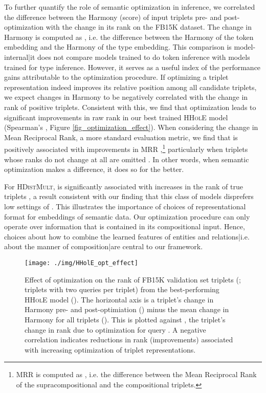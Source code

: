 \documentclass[a4paper,10pt]{article}
\begin{document}
To further quantify the role of semantic optimization in inference, we correlated the difference between the Harmony (score) of input triplets pre- and post-optimization with the change in its rank on the FB15K dataset. The change in Harmony is computed as , i.e. the difference between the Harmony of the token embedding and the Harmony of the type embedding. This comparison is model-internal|it does not compare models trained to do token inference with models trained for type inference. However, it serves as a useful index of the performance gains attributable to the optimization procedure. If optimizing a triplet representation indeed improves its relative position among all candidate triplets, we expect changes in Harmony to be negatively correlated with the change in rank of positive triplets. Consistent with this, we find that optimization leads to significant improvements in raw rank in our best trained \textsc{HHolE} model (Spearman's , Figure \ref{fig_optimization_effect}). When considering the change in Mean Reciprocal Rank, a more standard evaluation metric, we find that  is positively associated with improvements in MRR ,\footnote{MRR is computed as , i.e. the difference between the Mean Reciprocal Rank of the supracompositional and the compositional triplets.} particularly when triplets whose ranks do not change at all are omitted . In other words, when semantic optimization makes a difference, it does so for the better. 

For \textsc{HDistMult},  is significantly associated with increases in the rank of true triplets , a result consistent with our finding that this class of models disprefers low settings of . This illustrates the importance of choices of representational format for embeddings of semantic data. Our optimization procedure can only operate over information that is contained in its compositional input. Hence, choices about how to combine the learned features of entities and relations|i.e. about the manner of composition|are central to our framework.
\begin{figure}
\texttt{[image: ./img/HHolE\_opt\_effect]}
\caption{Effect of optimization on the rank of FB15K validation set triplets (;  triplets with two queries per triplet) from the best-performing \textsc{HHolE} model (). The horizontal axis is a triplet's change in Harmony pre- and post-optimiation () minus the mean change in Harmony for all triplets (). This is plotted against , the triplet's change in rank due to optimization for query . A negative correlation indicates reductions in rank (improvements) associated with increasing optimization of triplet representations.
}
\end{figure}\label{fig_optimization_effect}
\end{document}

